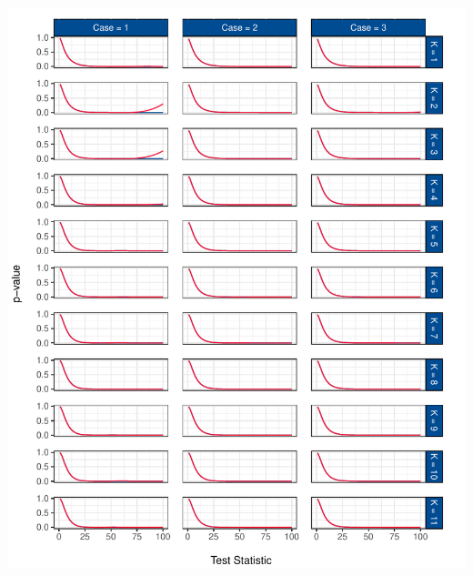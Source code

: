 \documentclass[12pt,a4paper]{article}
\let\origfigure\figure
\let\endorigfigure\endfigure
\renewenvironment{figure}[1][2] {
    \expandafter\origfigure\expandafter[H]
} {
    \endorigfigure
}
\begin{document}
\begin{figure}
\centering
\includegraphics{p_approx_paper_files/figure-latex/p_stat_all-1.pdf}
\caption{\label{fig:fig_3} Corrected and uncorrected \(p\)-value
predictions for case 1 and all underlying tests included.}
\end{figure}
\end{document}
